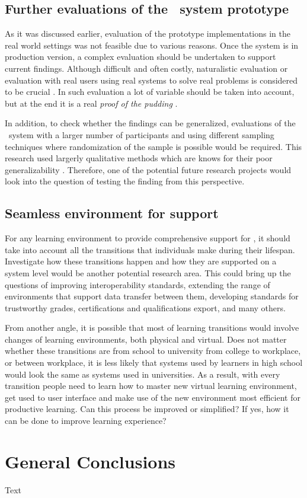 \subsection{Further evaluations of the \ep~system prototype}
As it was discussed earlier, evaluation of the prototype implementations in the
real world settings was not feasible due to various reasons. Once the system is
in production version, a complex evaluation should be undertaken to support
current findings. Although difficult and often costly, naturalistic evaluation
or evaluation with real users using real systems to solve real problems is
considered to be crucial \citep{Pries-Heje2008}. In such evaluation a lot of
variable should be taken into account, but at the end it is a real \textit{proof
of the pudding} \citep{Venable2010}.

In addition, to check whether the findings can be generalized, evaluations of
the \ep~system with a larger number of participants and using different sampling
techniques where randomization of the sample is possible would be required. This
research used largerly qualitative methods which are knows for their poor
generalizability \citep{Trochim2001}. Therefore, one of the potential
future research projects would look into the question of testing the finding
from this perspective.

\subsection{Seamless environment for \LLLs support} 
For any learning environment to provide comprehensive support for \LLLs, it
should take into account all the transitions that individuals make during their
lifespan. Investigate how these transitions happen and how they are supported on
a system level would be another potential research area. This could bring up the
questions of improving interoperability standards, extending the range of
environments that support data transfer between them, developing standards for
trustworthy grades, certifications and qualifications export, and many others.

From another angle, it is possible that most of learning transitions would
involve changes of learning environments, both physical and virtual. Does not
matter whether these transitions are from school to university from college to
workplace, or between workplace, it is less likely that systems used by learners
in high school would look the same as systems used in universities. As a result,
with every transition people need to learn how to master new virtual learning
environment, get used to user interface and make use of the new environment most
efficient for productive learning. Can this process be improved or simplified?
If yes, how it can be done to improve learning experience?

\section{General Conclusions}

Text